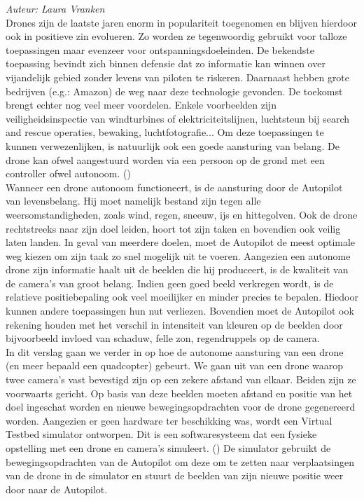 {\em Auteur: Laura Vranken}\\


Drones zijn de laatste jaren enorm in populariteit toegenomen en blijven hierdoor ook in positieve zin evolueren. Zo worden ze tegenwoordig gebruikt voor talloze toepassingen maar evenzeer voor ontspanningsdoeleinden. De bekendste toepassing bevindt zich binnen defensie dat zo informatie kan winnen over vijandelijk gebied zonder levens van piloten te riskeren. Daarnaast hebben grote bedrijven (e.g.: Amazon) de weg naar deze technologie gevonden. De toekomst brengt echter nog veel meer voordelen. Enkele voorbeelden zijn veiligheidsinspectie van windturbines of elektriciteitslijnen, luchtsteun bij search and rescue operaties, bewaking, luchtfotografie... Om deze toepassingen te kunnen verwezenlijken, is natuurlijk ook een goede aansturing van belang. De drone kan ofwel aangestuurd worden via een persoon op de grond met een controller ofwel autonoom. (\cite{website:microdrones})\\

Wanneer een drone autonoom functioneert, is de aansturing door de Autopilot van levensbelang. Hij moet namelijk bestand zijn tegen alle weersomstandigheden, zoals wind, regen, sneeuw, ijs en hittegolven. Ook de drone rechtstreeks naar zijn doel leiden, hoort tot zijn taken en bovendien ook veilig laten landen. In geval van meerdere doelen, moet de Autopilot de meest optimale weg kiezen om zijn taak zo snel mogelijk uit te voeren. Aangezien een autonome drone zijn informatie haalt uit de beelden die hij produceert, is de kwaliteit van de camera's van groot belang. Indien geen goed beeld verkregen wordt, is de relatieve positiebepaling ook veel moeilijker en minder precies te bepalen. Hiedoor kunnen andere toepassingen hun nut verliezen. Bovendien moet de Autopilot ook rekening houden met het verschil in intensiteit van kleuren op de beelden door bijvoorbeeld invloed van schaduw, felle zon, regendruppels op de camera.\\

In dit verslag gaan we verder in op hoe de autonome aansturing van een drone (en meer bepaald een quadcopter) gebeurt. We gaan uit van een drone waarop twee camera's vast bevestigd zijn op een zekere afstand van elkaar. Beiden zijn ze voorwaarts gericht. Op basis van deze beelden moeten afstand en positie van het doel ingeschat worden en nieuwe bewegingsopdrachten voor de drone gegenereerd worden. Aangezien er geen hardware ter beschikking was, wordt een Virtual Testbed simulator ontworpen. Dit is een softwaresysteem dat een fysieke opstelling met een drone en camera's simuleert. (\cite{arcticle:opgavePeno}) De simulator gebruikt de bewegingsopdrachten van de Autopilot om deze om te zetten naar verplaatsingen van de drone in de simulator en stuurt de beelden van zijn nieuwe positie weer door naar de Autopilot. \\

